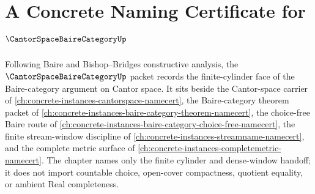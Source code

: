 \chapter{A Concrete Naming Certificate for $\CantorSpaceBaireCategoryUp$}
\label{ch:concrete-instances-cantor-space-baire-category-namecert}

Following Baire and Bishop--Bridges constructive analysis, the $\CantorSpaceBaireCategoryUp$ packet records the finite-cylinder face of the Baire-category argument on Cantor space. It sits beside the Cantor-space carrier of \autoref{ch:concrete-instances-cantorspace-namecert}, the Baire-category theorem packet of \autoref{ch:concrete-instances-baire-category-theorem-namecert}, the choice-free Baire route of \autoref{ch:concrete-instances-baire-category-choice-free-namecert}, the finite stream-window discipline of \autoref{ch:concrete-instances-streamname-namecert}, and the complete metric surface of \autoref{ch:concrete-instances-completemetric-namecert}. The chapter names only the finite cylinder and dense-window handoff; it does not import countable choice, open-cover compactness, quotient equality, or ambient Real completeness.

